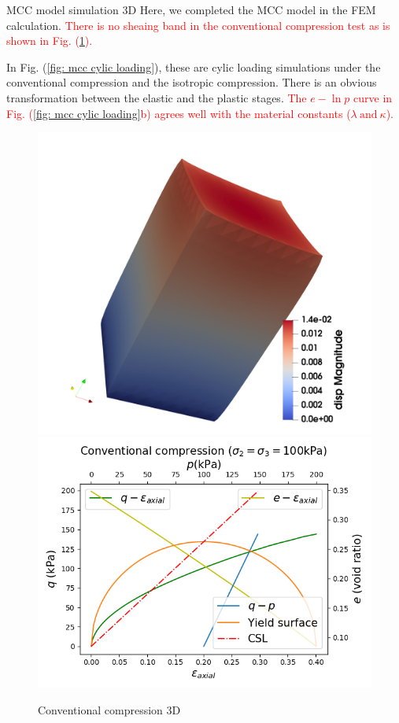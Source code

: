 \documentclass[aspectratio=169]{beamer}
\begin{document}
\begin{frame}{MCC model simulation 3D}
	\fontsize{9}{9}\selectfont
	Here, we completed the MCC model in the FEM calculation. \textcolor{red}{There is no sheaing band in the conventional compression test as is shown in Fig. (\ref{fig: mcc conventional compression}).} 
	
	\vspace{2mm}
	In Fig. (\ref{fig: mcc cylic loading}), these are cylic loading simulations under the conventional compression and the isotropic compression. There is an obvious transformation between the elastic and the plastic stages. \textcolor{red}{The $e-\ln p$ curve in Fig. (\ref{fig: mcc cylic loading}b) agrees well with the material constants ($\lambda\ \mathrm{and}\ \kappa$).}
	
	\vspace{3mm}
	\begin{minipage}{0.48\linewidth}
		\begin{figure}
			\centering
			\includegraphics[width=0.46\linewidth]{./pic/mcc/conventional compression 100kpa-u.png}
			\includegraphics[width=0.52\linewidth]{./pic/mcc/conventional compression 100kpa.png}
			\caption{Conventional compression 3D}
			\label{fig: mcc conventional compression}
		\end{figure}
	\end{minipage}
	\begin{minipage}{0.48\linewidth}
		\begin{figure}

\end{figure}
\end{minipage}
\end{frame}
\end{document}

